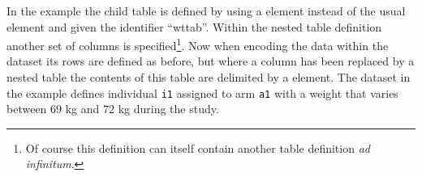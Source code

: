 %
In the example the child table is defined by using a 
element instead of the usual  element and given the
identifier ``wttab''. Within the nested table definition another set
of columns is specified\footnote{Of course this definition can itself
contain another table definition \emph{ad infinitum}.}. Now when
encoding the data within the dataset its rows are defined as before,
but where a column has been replaced by a nested table the contents of
this table are delimited by a  element. The dataset in
the example defines individual \texttt{i1} assigned to arm
\texttt{a1} with a weight that varies between $69$ kg and $72$ kg during
the study.





